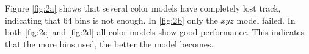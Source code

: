 \documentclass[11pt]{article}
\begin{document}
Figure \ref{fig:2a} shows that several color models have completely lost track,
indicating that $64$ bins is not enough. In \ref{fig:2b} only the $xyz$ model failed.
In both \ref{fig:2c} and \ref{fig:2d} all color models show good performance.
This indicates that the more bins used, the better the model becomes.

\begin{figure}[!ht]
\centering
{}
\\
\end{figure}
\end{document}

